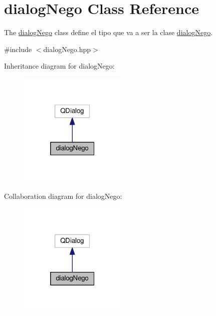 \hypertarget{classdialogNego}{}\section{dialog\+Nego Class Reference}
\label{classdialogNego}


The \hyperlink{classdialogNego}{dialog\+Nego} class define el tipo que va a ser la clase \hyperlink{classdialogNego}{dialog\+Nego}.  




{\ttfamily \#include $<$dialog\+Nego.\+hpp$>$}



Inheritance diagram for dialog\+Nego\+:
\nopagebreak
\begin{figure}[H]
\begin{center}
\leavevmode
\includegraphics[width=145pt]{classdialogNego__inherit__graph}
\end{center}
\end{figure}


Collaboration diagram for dialog\+Nego\+:
\nopagebreak
\begin{figure}[H]
\begin{center}
\leavevmode
\includegraphics[width=145pt]{classdialogNego__coll__graph}
\end{center}
\end{figure}
